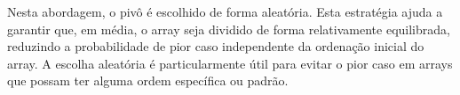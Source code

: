 Nesta abordagem, o pivô é escolhido de forma aleatória. Esta estratégia ajuda a garantir que, em média, o array seja dividido de forma relativamente equilibrada, reduzindo a probabilidade de pior caso independente da ordenação inicial do array. A escolha aleatória é particularmente útil para evitar o pior caso em arrays que possam ter alguma ordem específica ou padrão.